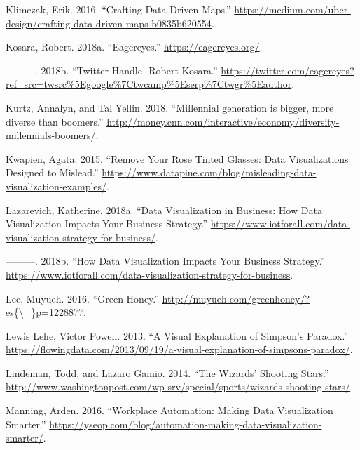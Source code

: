 \documentclass[]{book}
\begin{document}
\leavevmode\hypertarget{ref-uber_maps}{}%
Klimczak, Erik. 2016. ``Crafting Data-Driven Maps.'' \url{https://medium.com/uber-design/crafting-data-driven-maps-b0835b620554}.

\leavevmode\hypertarget{ref-eagereyes_viz}{}%
Kosara, Robert. 2018a. ``Eagereyes.'' \url{https://eagereyes.org/}.

\leavevmode\hypertarget{ref-twitter_Kosara}{}%
---------. 2018b. ``Twitter Handle- Robert Kosara.'' \url{https://twitter.com/eagereyes?ref_src=twsrc\%5Egoogle\%7Ctwcamp\%5Eserp\%7Ctwgr\%5Eauthor}.

\leavevmode\hypertarget{ref-age_groups}{}%
Kurtz, Annalyn, and Tal Yellin. 2018. ``Millennial generation is bigger, more diverse than boomers.'' \url{http://money.cnn.com/interactive/economy/diversity-millennials-boomers/}.

\leavevmode\hypertarget{ref-misleading_data}{}%
Kwapien, Agata. 2015. ``Remove Your Rose Tinted Glasses: Data Visualizations Designed to Mislead.'' \url{https://www.datapine.com/blog/misleading-data-visualization-examples/}.

\leavevmode\hypertarget{ref-strategy_impact}{}%
Lazarevich, Katherine. 2018a. ``Data Visualization in Business: How Data Visualization Impacts Your Business Strategy.'' \url{https://www.iotforall.com/data-visualization-strategy-for-business/}.

\leavevmode\hypertarget{ref-biz_strategy}{}%
---------. 2018b. ``How Data Visualization Impacts Your Business Strategy.'' \url{https://www.iotforall.com/data-visualization-strategy-for-business}.

\leavevmode\hypertarget{ref-green_honey}{}%
Lee, Muyueh. 2016. ``Green Honey.'' \href{http://muyueh.com/greenhoney/?es\%7B/_\%7Dp=1228877}{http://muyueh.com/greenhoney/?es\{\textbackslash{}\_\}p=1228877}.

\leavevmode\hypertarget{ref-simpson_paradox}{}%
Lewis Lehe, Victor Powell. 2013. ``A Visual Explanation of Simpson's Paradox.'' \url{https://flowingdata.com/2013/09/19/a-visual-explanation-of-simpsons-paradox/}.

\leavevmode\hypertarget{ref-basketball}{}%
Lindeman, Todd, and Lazaro Gamio. 2014. ``The Wizards' Shooting Stars.'' \url{http://www.washingtonpost.com/wp-srv/special/sports/wizards-shooting-stars/}.

\leavevmode\hypertarget{ref-work_place}{}%
Manning, Arden. 2016. ``Workplace Automation: Making Data Visualization Smarter.'' \url{https://yseop.com/blog/automation-making-data-visualization-smarter/}.
\end{document}

